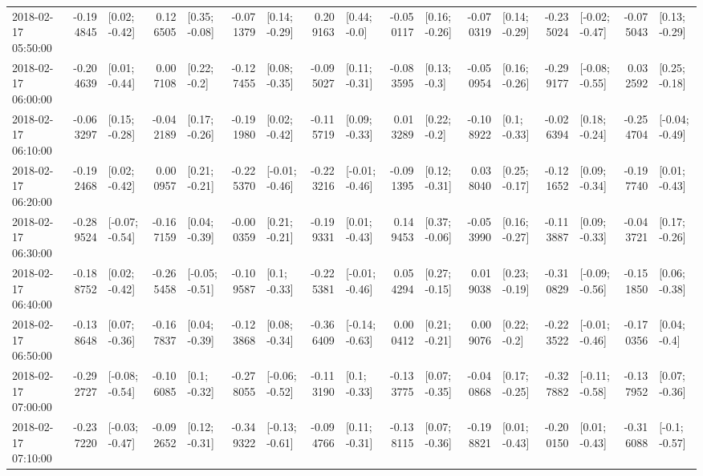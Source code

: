 \begin{tabular}{lrlrlrlrlrlrlrlrl}
2018-02-17 05:50:00 & -0.194845 &   [0.02; -0.42] &  0.126505 &   [0.35; -0.08] & -0.071379 &   [0.14; -0.29] &  0.209163 &    [0.44; -0.0] & -0.050117 &   [0.16; -0.26] & -0.070319 &   [0.14; -0.29] & -0.235024 &  [-0.02; -0.47] & -0.075043 &   [0.13; -0.29] \\
2018-02-17 06:00:00 & -0.204639 &   [0.01; -0.44] &  0.007108 &    [0.22; -0.2] & -0.127455 &   [0.08; -0.35] & -0.095027 &   [0.11; -0.31] & -0.083595 &    [0.13; -0.3] & -0.050954 &   [0.16; -0.26] & -0.299177 &  [-0.08; -0.55] &  0.032592 &   [0.25; -0.18] \\
2018-02-17 06:10:00 & -0.063297 &   [0.15; -0.28] & -0.042189 &   [0.17; -0.26] & -0.191980 &   [0.02; -0.42] & -0.115719 &   [0.09; -0.33] &  0.013289 &    [0.22; -0.2] & -0.108922 &    [0.1; -0.33] & -0.026394 &   [0.18; -0.24] & -0.254704 &  [-0.04; -0.49] \\
2018-02-17 06:20:00 & -0.192468 &   [0.02; -0.42] &  0.000957 &   [0.21; -0.21] & -0.225370 &  [-0.01; -0.46] & -0.223216 &  [-0.01; -0.46] & -0.091395 &   [0.12; -0.31] &  0.038040 &   [0.25; -0.17] & -0.121652 &   [0.09; -0.34] & -0.197740 &   [0.01; -0.43] \\
2018-02-17 06:30:00 & -0.289524 &  [-0.07; -0.54] & -0.167159 &   [0.04; -0.39] & -0.000359 &   [0.21; -0.21] & -0.199331 &   [0.01; -0.43] &  0.149453 &   [0.37; -0.06] & -0.053990 &   [0.16; -0.27] & -0.113887 &   [0.09; -0.33] & -0.043721 &   [0.17; -0.26] \\
2018-02-17 06:40:00 & -0.188752 &   [0.02; -0.42] & -0.265458 &  [-0.05; -0.51] & -0.109587 &    [0.1; -0.33] & -0.225381 &  [-0.01; -0.46] &  0.054294 &   [0.27; -0.15] &  0.019038 &   [0.23; -0.19] & -0.310829 &  [-0.09; -0.56] & -0.151850 &   [0.06; -0.38] \\
2018-02-17 06:50:00 & -0.138648 &   [0.07; -0.36] & -0.167837 &   [0.04; -0.39] & -0.123868 &   [0.08; -0.34] & -0.366409 &  [-0.14; -0.63] &  0.000412 &   [0.21; -0.21] &  0.009076 &    [0.22; -0.2] & -0.223522 &  [-0.01; -0.46] & -0.170356 &    [0.04; -0.4] \\
2018-02-17 07:00:00 & -0.292727 &  [-0.08; -0.54] & -0.106085 &    [0.1; -0.32] & -0.278055 &  [-0.06; -0.52] & -0.113190 &    [0.1; -0.33] & -0.133775 &   [0.07; -0.35] & -0.040868 &   [0.17; -0.25] & -0.327882 &  [-0.11; -0.58] & -0.137952 &   [0.07; -0.36] \\
2018-02-17 07:10:00 & -0.237220 &  [-0.03; -0.47] & -0.092652 &   [0.12; -0.31] & -0.349322 &  [-0.13; -0.61] & -0.094766 &   [0.11; -0.31] & -0.138115 &   [0.07; -0.36] & -0.198821 &   [0.01; -0.43] & -0.200150 &   [0.01; -0.43] & -0.316088 &   [-0.1; -0.57] \\

\end{tabular}
